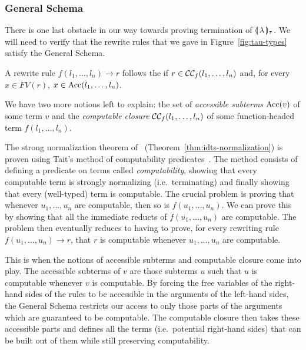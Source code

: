 \subsubsection{General Schema}
\label{sssec:general-schema}

There is one last obstacle in our way towards proving termination of
$\llparenthesis \, \lambda \, \rrparenthesis_\tau$. We will need to verify that the rewrite rules that
we gave in Figure~\ref{fig:tau-types} satisfy the General Schema.

\begin{definition}
  A rewrite rule $f(l_1, \ldots, l_n) \to r$ follows the  if $r \in \mathcal{C}\mathcal{C}_f(l_1, \ldots, l_n)$ and, for every
  $x \in FV(r)$, $x \in \operatorname{Acc}(l_1, \ldots, l_n)$.
\end{definition}

We have two more notions left to explain: the set of \emph{accessible
  subterms} $\operatorname{Acc}(v)$ of some term $v$ and the \emph{computable closure}
$\mathcal{C}\mathcal{C}_f(l_1, \ldots, l_n)$ of some function-headed term
$f(l_1, \ldots, l_n)$.

The strong normalization theorem of~\cite{blanqui2002inductive}
(Theorem~\ref{thm:idts-normalization}) is proven using Tait's method of
computability predicates~\cite{tait1967intensional}. The method consists of
defining a predicate on terms called \emph{computability}, showing that
every computable term is strongly normalizing (i.e.\ terminating) and
finally showing that every (well-typed) term is computable. The crucial
problem is proving that whenever $u_1, \ldots, u_n$ are computable, then so
is $f(u_1, \ldots, u_n)$. We can prove this by showing that all the
immediate reducts of $f(u_1, \ldots, u_n)$ are computable. The problem then
eventually reduces to having to prove, for every rewriting rule
$f(u_1, \ldots, u_n) \to r$, that $r$ is computable whenever
$u_1, \ldots, u_n$ are computable.

This is when the notions of accessible subterms and computable closure come
into play. The accessible subterms of $v$ are those subterms $u$ such that
$u$ is computable whenever $v$ is computable. By forcing the free variables
of the right-hand sides of the rules to be accessible in the arguments of
the left-hand sides, the General Schema restricts our access to only those
parts of the arguments which are guaranteed to be computable. The
computable closure then takes these accessible parts and defines all the
terms (i.e.\ potential right-hand sides) that can be built out of them
while still preserving computability.

